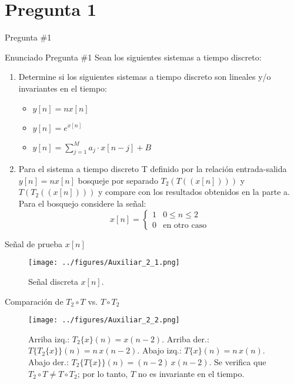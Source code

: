 \documentclass[
    10pt,
    aspectratio=169,
    xcolor={dvipsnames},
    spanish,
    ]{beamer}
\begin{document}
\section{Pregunta 1}
\begin{frame}{Pregunta \#1}
\begin{block}{Enunciado Pregunta \#1}
 Sean los siguientes sistemas a tiempo discreto:

\begin{enumerate}
\item Determine si los siguientes sistemas a tiempo discreto son lineales y/o invariantes en el tiempo:
\begin{itemize}
\item $y[n] = nx[n]$
\item $y[n] = e^{x[n]}$
\item $y[n] = \sum_{j=1}^{M} a_j \cdot x[n-j] + B$
\end{itemize}

\item Para el sistema a tiempo discreto T definido por la relación entrada-salida $y[n] = nx[n]$ bosqueje por separado $T_2(T((x[n])))$ y $T(T_2((x[n])))$ y compare con los resultados obtenidos en la parte a. Para el bosquejo considere la señal:
\begin{equation}
x[n] = \begin{cases}
1 & 0 \leq n \leq 2 \\
0 & \text{en otro caso}
\end{cases}
\end{equation}
\end{enumerate}
\end{block}
\end{frame}
\begin{frame}{Señal de prueba $x[n]$}
\begin{figure}
  \texttt{[image: ../figures/Auxiliar\_2\_1.png]}
  \caption{\scriptsize Señal discreta $x[n]$.}
\end{figure}
\end{frame}
\begin{frame}{Comparación de $T_2\circ T$ vs. $T\circ T_2$}
\begin{figure}
  \texttt{[image: ../figures/Auxiliar\_2\_2.png]}
  \caption{\scriptsize Arriba izq.: $T_2\{x\}(n)=x(n-2)$. Arriba der.: $T\{T_2\{x\}\}(n)=n\,x(n-2)$. Abajo izq.: $T\{x\}(n)=n\,x(n)$. Abajo der.: $T_2\{T\{x\}\}(n)=(n-2)\,x(n-2)$. Se verifica que $T_2\circ T\ne T\circ T_2$; por lo tanto, $T$ no es invariante en el tiempo.}
\end{figure}
\end{frame}
\end{document}
